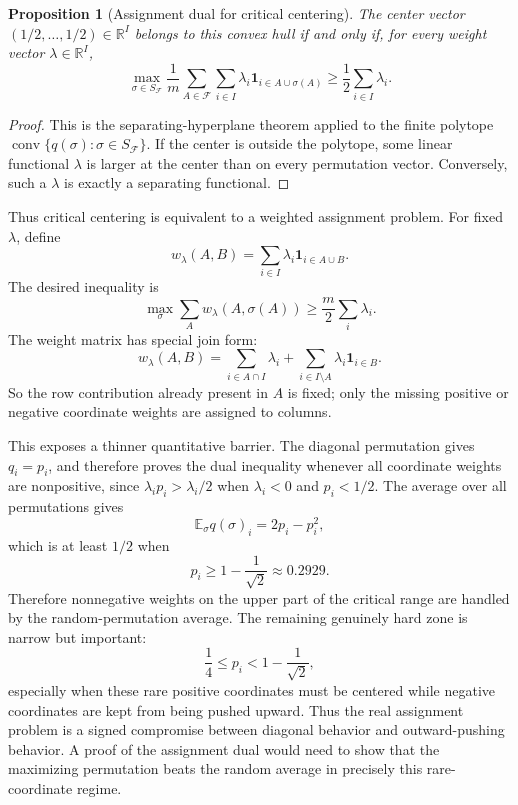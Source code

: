 \documentclass[11pt]{article}
\newtheorem{proposition}{Proposition}
\begin{document}
\begin{proposition}[Assignment dual for critical centering]
The center vector $(1/2,\dots,1/2)\in\mathbb{R}^{I}$ belongs to this convex
hull if and only if, for every weight vector $\lambda\in\mathbb{R}^{I}$,
\[
  \max_{\sigma\in S_{\mathcal{F}}}
  \frac1m
  \sum_{A\in\mathcal{F}}
  \sum_{i\in I}
  \lambda_i\mathbf{1}_{i\in A\cup\sigma(A)}
  \geq
  \frac12\sum_{i\in I}\lambda_i.
\]
\end{proposition}

\begin{proof}
This is the separating-hyperplane theorem applied to the finite polytope
$\operatorname{conv}\{q(\sigma):\sigma\in S_{\mathcal{F}}\}$.  If the center
is outside the polytope, some linear functional $\lambda$ is larger at the
center than on every permutation vector.  Conversely, such a $\lambda$ is
exactly a separating functional.
\end{proof}

Thus critical centering is equivalent to a weighted assignment problem.  For
fixed $\lambda$, define
\[
  w_\lambda(A,B)
  =
  \sum_{i\in I}\lambda_i\mathbf{1}_{i\in A\cup B}.
\]
The desired inequality is
\[
  \max_{\sigma}
  \sum_A w_\lambda(A,\sigma(A))
  \geq
  \frac{m}{2}\sum_i\lambda_i.
\]
The weight matrix has special join form:
\[
  w_\lambda(A,B)
  =
  \sum_{i\in A\cap I}\lambda_i
  +
  \sum_{i\in I\setminus A}\lambda_i\mathbf{1}_{i\in B}.
\]
So the row contribution already present in $A$ is fixed; only the missing
positive or negative coordinate weights are assigned to columns.

This exposes a thinner quantitative barrier.  The diagonal permutation gives
$q_i=p_i$, and therefore proves the dual inequality whenever all coordinate
weights are nonpositive, since $\lambda_i p_i>\lambda_i/2$ when
$\lambda_i<0$ and $p_i<1/2$.  The average over all permutations gives
\[
  \mathbb{E}_\sigma q(\sigma)_i=2p_i-p_i^2,
\]
which is at least $1/2$ when
\[
  p_i\geq 1-\frac1{\sqrt{2}}\approx 0.2929.
\]
Therefore nonnegative weights on the upper part of the critical range are
handled by the random-permutation average.  The remaining genuinely hard zone
is narrow but important:
\[
  \frac14\leq p_i<1-\frac1{\sqrt{2}},
\]
especially when these rare positive coordinates must be centered while
negative coordinates are kept from being pushed upward.  Thus the real
assignment problem is a signed compromise between diagonal behavior and
outward-pushing behavior.  A proof of the assignment dual would need to show
that the maximizing permutation beats the random average in precisely this
rare-coordinate regime.
\end{document}
